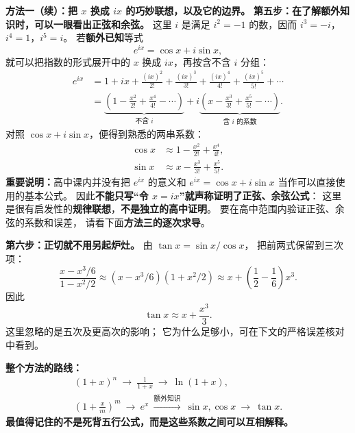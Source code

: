 \clearpage
\begin{proofbox}
\textbf{方法一（续）：把 $x$ 换成 $ix$ 的巧妙联想，以及它的边界。}
\textbf{第五步：在了解额外知识时，可以一眼看出正弦和余弦。}
这里 $i$ 是满足 $i^2=-1$ 的数，因而
$i^3=-i$，$i^4=1$，$i^5=i$。
若\textbf{额外已知}等式
\[
 e^{ix}=\cos x+i\sin x,
\]
就可以把指数的形式展开中的 $x$ 换成 $ix$，再按含不含 $i$ 分组：
\[
 \begin{aligned}
 e^{ix}
 &=1+ix+\frac{(ix)^2}{2!}+\frac{(ix)^3}{3!}
 +\frac{(ix)^4}{4!}+\frac{(ix)^5}{5!}+\cdots\\
 &=\underbrace{\left(1-\frac{x^2}{2!}+\frac{x^4}{4!}-\cdots\right)}_{
 \text{不含 }i}
 +i\underbrace{\left(x-\frac{x^3}{3!}+\frac{x^5}{5!}-\cdots\right)}_{
 \text{含 }i\text{ 的系数}}.
 \end{aligned}
\]
对照 $\cos x+i\sin x$，便得到熟悉的两串系数：
\[
 \boxed{\begin{aligned}
 \cos x&\approx1-\frac{x^2}{2!}+\frac{x^4}{4!},\\
 \sin x&\approx x-\frac{x^3}{3!}+\frac{x^5}{5!}.
 \end{aligned}}
\]
\textbf{重要说明：}高中课内并没有把 $e^{ix}$ 的意义和
$e^{ix}=\cos x+i\sin x$ 当作可以直接使用的基本公式。
因此\textbf{不能只写“令 $x=ix$”就声称证明了正弦、余弦公式}：
这里是很有启发性的\textbf{规律联想}，\textbf{不是独立的高中证明}。
要在高中范围内验证正弦、余弦的系数和误差，
请看下面\textbf{方法三的逐次求导}。

\medskip
\textbf{第六步：正切就不用另起炉灶。}
由 $\tan x=\sin x/\cos x$，
把前两式保留到三次项：
\[
 \frac{x-x^3/6}{1-x^2/2}
 \approx(x-x^3/6)(1+x^2/2)
 \approx x+\left(\frac12-\frac16\right)x^3.
\]
因此
\[
 \boxed{\tan x\approx x+\frac{x^3}{3}}.
\]
这里忽略的是五次及更高次的影响；
它为什么足够小，可在下文的严格误差核对中看到。

\textbf{整个方法的路线：}
\[
 \boxed{\begin{gathered}
 (1+x)^n\ \longrightarrow\ \frac1{1+x}\ \longrightarrow\ \ln(1+x),\\
 \left(1+\frac{x}{m}\right)^m\ \longrightarrow\ e^x
 \ \overset{\text{额外知识}}{\longrightarrow}\ \sin x,\cos x
 \ \longrightarrow\ \tan x.
 \end{gathered}}
\]
\textbf{最值得记住的不是死背五行公式，而是这些系数之间可以互相解释。}
\end{proofbox}

